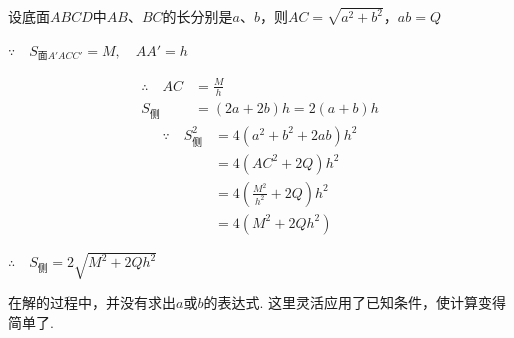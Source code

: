 \begin{solution}
设底面$ABCD$中$AB$、$BC$的长分别是$a$、$b$，则$AC=\sqrt{a^2+b^2}$，$ab=Q$

$\because\quad S_{\text{面}A'ACC'}=M,\quad AA'=h$


\noindent
\begin{minipage}{.53\textwidth}\CTEXindent
\[\begin{split}
   \therefore\quad AC&=\frac{M}{h}\\
    S_{\text{侧}}&=(2a+2b)h=2(a+b)h  
\end{split}\]
\[\begin{split}
    \because\quad S^2_{\text{侧}}&=4(a^2+b^2+2ab)h^2\\
    &=4(AC^2+2Q)h^2\\
    &=4\left(\frac{M^2}{h^2}+2Q\right)h^2\\
    &=4(M^2+2Qh^2)
\end{split} \]
\end{minipage}
\hfill
\begin{minipage}{.45\textwidth}
\centering
{}
\end{minipage}



$\therefore\quad  S_{\text{侧}}=2\sqrt{M^2+2Qh^2}$
\end{solution}

\begin{remark}
    在解的过程中，并没有求出$a$或$b$的表达式. 这里灵活应用了已知条件，使计算变得简单了.
\end{remark}



